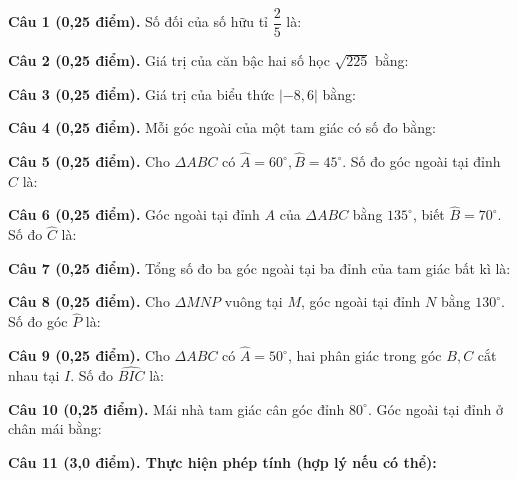 \documentclass[12pt,a4paper]{article}
\begin{document}
\vspace{1.5mm}
\noindent\textbf{Câu 1 (0,25 điểm).} Số đối của số hữu tỉ $\dfrac{2}{5}$ là: \par\vspace{2.7mm}
\noindent\textbf{Câu 2 (0,25 điểm).} Giá trị của căn bậc hai số học $\sqrt{225}$ bằng: \par\vspace{2.7mm}
\noindent\textbf{Câu 3 (0,25 điểm).} Giá trị của biểu thức $|-8{,}6|$ bằng: \par\vspace{2.7mm}
\noindent\textbf{Câu 4 (0,25 điểm).} Mỗi góc ngoài của một tam giác có số đo bằng: \par\vspace{2.7mm}
\noindent\textbf{Câu 5 (0,25 điểm).} Cho $\Delta ABC$ có $\widehat{A} = 60^\circ, \widehat{B} = 45^\circ$. Số đo góc ngoài tại đỉnh $C$ là: \par\vspace{2.7mm}
\noindent\textbf{Câu 6 (0,25 điểm).} Góc ngoài tại đỉnh $A$ của $\Delta ABC$ bằng $135^\circ$, biết $\widehat{B} = 70^\circ$. Số đo $\widehat{C}$ là: \par\vspace{2.7mm}
\noindent\textbf{Câu 7 (0,25 điểm).} Tổng số đo ba góc ngoài tại ba đỉnh của tam giác bất kì là: \par\vspace{2.7mm}
\noindent\textbf{Câu 8 (0,25 điểm).} Cho $\Delta MNP$ vuông tại $M$, góc ngoài tại đỉnh $N$ bằng $130^\circ$. Số đo góc $\widehat{P}$ là: \par\vspace{2.7mm}
\noindent\textbf{Câu 9 (0,25 điểm).} Cho $\Delta ABC$ có $\widehat{A} = 50^\circ$, hai phân giác trong góc $B, C$ cắt nhau tại $I$. Số đo $\widehat{BIC}$ là: \par\vspace{2.7mm}
\noindent\textbf{Câu 10 (0,25 điểm).} Mái nhà tam giác cân góc đỉnh $80^\circ$. Góc ngoài tại đỉnh ở chân mái bằng: \par\vspace{2.7mm}
\vspace{0.2mm}
\noindent\textbf{Câu 11 (3,0 điểm). Thực hiện phép tính (hợp lý nếu có thể):}
\vspace{0.8mm}
\end{document}

